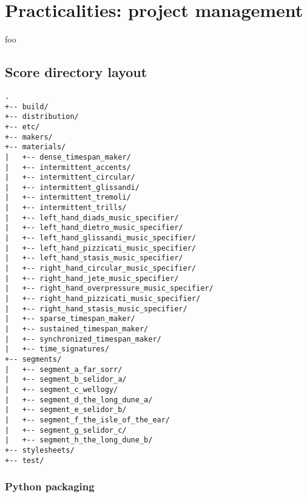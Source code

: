 \chapter{Practicalities: project management}
\label{chap:practicalities}

foo

\section{Score directory layout}

\begin{singlespacing}
\vspace{-0.5\baselineskip}
\begin{lstlisting}
.
+-- build/
+-- distribution/
+-- etc/
+-- makers/
+-- materials/
|   +-- dense_timespan_maker/
|   +-- intermittent_accents/
|   +-- intermittent_circular/
|   +-- intermittent_glissandi/
|   +-- intermittent_tremoli/
|   +-- intermittent_trills/
|   +-- left_hand_diads_music_specifier/
|   +-- left_hand_dietro_music_specifier/
|   +-- left_hand_glissandi_music_specifier/
|   +-- left_hand_pizzicati_music_specifier/
|   +-- left_hand_stasis_music_specifier/
|   +-- right_hand_circular_music_specifier/
|   +-- right_hand_jete_music_specifier/
|   +-- right_hand_overpressure_music_specifier/
|   +-- right_hand_pizzicati_music_specifier/
|   +-- right_hand_stasis_music_specifier/
|   +-- sparse_timespan_maker/
|   +-- sustained_timespan_maker/
|   +-- synchronized_timespan_maker/
|   +-- time_signatures/
+-- segments/
|   +-- segment_a_far_sorr/
|   +-- segment_b_selidor_a/
|   +-- segment_c_wellogy/
|   +-- segment_d_the_long_dune_a/
|   +-- segment_e_selidor_b/
|   +-- segment_f_the_isle_of_the_ear/
|   +-- segment_g_selidor_c/
|   +-- segment_h_the_long_dune_b/
+-- stylesheets/
+-- test/
\end{lstlisting}
\end{singlespacing}

\subsection{Python packaging}

